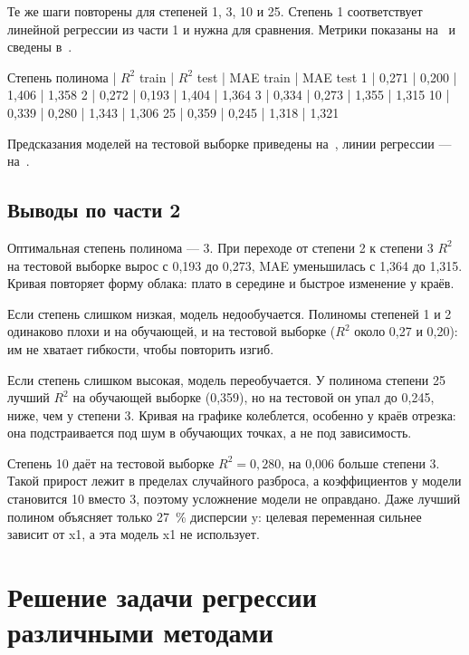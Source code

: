 \documentclass[a4paper,14pt]{extarticle}
\begin{document}
Те же шаги повторены для степеней 1, 3, 10 и 25. Степень 1 соответствует линейной регрессии из части 1 и нужна для сравнения. Метрики показаны на~ и сведены в~.


Степень полинома | $R^2$ train | $R^2$ test | MAE train | MAE test
1 | 0,271 | 0,200 | 1,406 | 1,358
2 | 0,272 | 0,193 | 1,404 | 1,364
3 | 0,334 | 0,273 | 1,355 | 1,315
10 | 0,339 | 0,280 | 1,343 | 1,306
25 | 0,359 | 0,245 | 1,318 | 1,321

Предсказания моделей на тестовой выборке приведены на~, линии регрессии — на~.



\subsection{Выводы по части 2}

Оптимальная степень полинома — 3. При переходе от степени 2 к степени 3 $R^2$ на тестовой выборке вырос с 0,193 до 0,273, MAE уменьшилась с 1,364 до 1,315. Кривая повторяет форму облака: плато в середине и быстрое изменение у краёв.

Если степень слишком низкая, модель недообучается. Полиномы степеней 1 и 2 одинаково плохи и на обучающей, и на тестовой выборке ($R^2$ около 0,27 и 0,20): им не хватает гибкости, чтобы повторить изгиб.

Если степень слишком высокая, модель переобучается. У полинома степени 25 лучший $R^2$ на обучающей выборке (0,359), но на тестовой он упал до 0,245, ниже, чем у степени 3. Кривая на графике колеблется, особенно у краёв отрезка: она подстраивается под шум в обучающих точках, а не под зависимость.

Степень 10 даёт на тестовой выборке $R^2 = 0{,}280$, на 0,006 больше степени 3. Такой прирост лежит в пределах случайного разброса, а коэффициентов у модели становится 10 вместо 3, поэтому усложнение модели не оправдано. Даже лучший полином объясняет только 27~\% дисперсии y: целевая переменная сильнее зависит от x1, а эта модель x1 не использует.

\section{Решение задачи регрессии различными методами}
\end{document}
